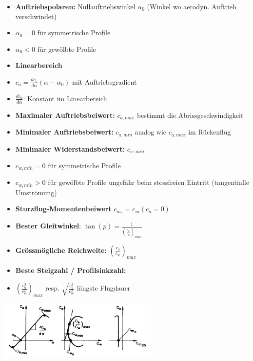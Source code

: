 \documentclass[8pt, landscape, fleqn]{scrartcl}
\begin{document}
\begin{multicols*}{3}
\begin{itemize}
    \item \textbf{Auftriebspolaren:} Nullauftriebswinkel $\alpha_0$ (Winkel wo aerodyn. Auftrieb verschwindet)
    \item $\alpha_0 = 0$ für symmetrische Profile
    \item $\alpha_0 < 0$ für gewölbte Profile
    \item \textbf{Linearbereich}
    \item $c_a = \frac{dc_a}{d\alpha}(\alpha-\alpha_0)$ mit Auftriebsgradient 
    \item $\frac{dc_a}{d\alpha}$: Konstant im Linearbereich
    \item \textbf{Maximaler Auftriebsbeiwert:} $c_{a,max}$ bestimmt die Abrissgeschwindigkeit
    \item \textbf{Minimaler Auftriebsbeiwert:} $c_{a,min}$ analog wie $c_{a,max}$ im Rückenflug
    \item \textbf{Minimaler Widerstandsbeiwert:} $c_{w,min}$ 
    \item $c_{w,min} = 0$ für symmetrische Profile
    \item $c_{w,min} > 0$ für gewölbte Profile ungefähr beim stossfreien Eintritt (tangentialle Umströmung)
    \item \textbf{Sturzflug-Momentenbeiwert} $c_{m_0} = c_m(c_a = 0)$
    \item \textbf{Bester Gleitwinkel}: $\tan(p) = \frac{1}{(\frac{c_a}{c_w})_{max}}$
    \item \textbf{Grössmögliche Reichweite:} $(\frac{c_a}{c_w})_{max}$
    \item \textbf{Beste Steigzahl / Profilsinkzahl:}
    \item $(\frac{c_a^3}{c_w^2})_{max}$ resp. $\sqrt{\frac{c_a^3}{c_w^2}}$ längste Flugdauer 
\end{itemize}

\begin{center}
    \includegraphics[width = 8cm]{Aufstiegspolaren.png}
\end{center}


\end{multicols*}
\end{document}
